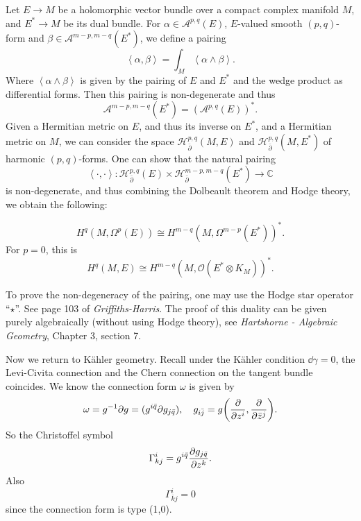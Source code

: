 \documentclass[12pt]{article}
\begin{document}
Let \(E\to M\) be a holomorphic vector bundle over a compact complex manifold \(M\),
and \(E^*\to M\) be its dual bundle. For \(\alpha\in \mathcal{A}^{p,q}(E)\),
\(E\)-valued smooth \((p,q)\)-form and \(\beta\in \mathcal{A}^{m-p,m-q}(E^*)\), we
define a pairing \[
  \left<\alpha,\beta\right> =\int_{M}\left<\alpha\wedge \beta\right> 
.\] Where \(\left<\alpha\wedge \beta\right> \) is given by the pairing of \(E\)
and \(E^*\) and the wedge product as differential forms. Then this pairing is
non-degenerate and thus \[
  \mathcal{A}^{m-p,m-q}(E^*)=\left(\mathcal{A}^{p,q}(E)\right)^*
.\] Given a Hermitian metric on \(E\), and thus its inverse on \(E^*\), and a
Hermitian metric on \(M\), we can consider the space \(\mathcal{H}_{\bar{\partial}}^{p,
q}(M,E)\) and \(\mathcal{H}_{\bar{\partial}}^{p,q}(M,E^*)\) of harmonic
\((p,q)\)-forms. One can show that the natural pairing \[
  \left<\cdot ,\cdot \right> \colon\mathcal{H}_{\bar{\partial}}^{p,q}(E)\times 
  \mathcal{H}_{\bar{\partial}}^{m-p,m-q}(E^*)\to \mathbb{C}
\] is non-degenerate, and thus combining the Dolbeault theorem and Hodge theory, we
obtain the following:
\begin{theorem}
  \[
    H^{q}(M,\Omega^p(E))\cong H^{m-q}(M,\Omega^{m-p}(E^*))^*
  .\] For \(p=0\), this is \[
    H^{q}(M,E)\cong H^{m-q}(M,\mathcal{O}(E^*\otimes K_M))^*
  .\]
\end{theorem}
\begin{remark}
  To prove the non-degeneracy of the pairing, one may use the Hodge star operator
  ``\(\star\)''. See page 103 of \emph{Griffiths-Harris}. The proof of this duality
  can be given purely algebraically (without using Hodge theory), see \emph{Hartshorne
  - Algebraic Geometry}, Chapter 3, section 7.
\end{remark}

Now we return to K\"ahler geometry.
Recall under the K\"ahler condition \(\dd{\gamma}=0\), the Levi-Civita connection
and the Chern connection on the tangent bundle coincides. We know the connection form
\(\omega\) is given by \[
  \omega=g^{-1}\partial g=(g^{i\bar{q}}\partial g_{j\bar{q}}),\quad
  g_{i\bar{j}}=g\left(\pd{z^i},\pd{\bar{z}^j}\right)
.\] So the Christoffel  symbol \[
  \Gamma_{kj}^i=g^{i\bar{q}}\pdv{g_{j\bar{q}}}{z^k}
.\] Also \[
  \Gamma_{\bar{k}j}^i=0
\] since the connection form is type (1,0).
\end{document}
